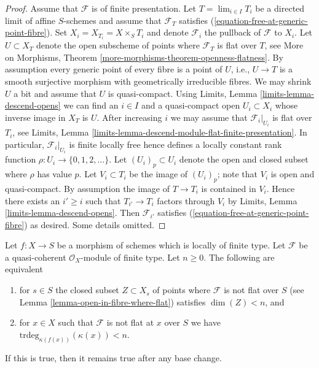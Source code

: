 \begin{proof}
\medskip\noindent
Assume that $\mathcal{F}$ is of finite presentation.
Let $T = \lim_{i \in I} T_i$ be a directed limit of affine $S$-schemes
and assume that $\mathcal{F}_T$ satisfies
(\ref{equation-free-at-generic-point-fibre}).
Set $X_i = X_{T_i} = X \times_S T_i$ and denote $\mathcal{F}_i$ the
pullback of $\mathcal{F}$ to $X_i$.
Let $U \subset X_T$ denote the open subscheme of points where
$\mathcal{F}_T$ is flat over $T$, see
More on Morphisms, Theorem \ref{more-morphisms-theorem-openness-flatness}.
By assumption every generic point of every fibre is a point of $U$, i.e.,
$U \to T$ is a smooth surjective morphism with geometrically irreducible
fibres. We may shrink $U$ a bit and assume that $U$ is quasi-compact.
Using
Limits, Lemma \ref{limits-lemma-descend-opens}
we can find an $i \in I$ and a quasi-compact open $U_i \subset X_i$
whose inverse image in $X_T$ is $U$. After increasing $i$ we may
assume that $\mathcal{F}_i|_{U_i}$ is flat over $T_i$, see
Limits, Lemma \ref{limits-lemma-descend-module-flat-finite-presentation}.
In particular, $\mathcal{F}_i|_{U_i}$ is finite locally free
hence defines a locally constant
rank function $\rho : U_i \to \{0, 1, 2, \ldots \}$.
Let $(U_i)_p \subset U_i$ denote the open and closed
subset where $\rho$ has value $p$. Let $V_i \subset T_i$ be the
image of $(U_i)_p$; note that $V_i$ is open and quasi-compact.
By assumption the image of $T \to T_i$ is contained in $V_i$.
Hence there exists an $i' \geq i$ such that $T_{i'} \to T_i$ factors
through $V_i$ by
Limits, Lemma \ref{limits-lemma-descend-opens}.
Then $\mathcal{F}_{i'}$ satisfies (\ref{equation-free-at-generic-point-fibre})
as desired. Some details omitted.
\end{proof}

\begin{lemma}
\label{lemma-pre-flat-dimension-n}
Let $f : X \to S$ be a morphism of schemes which is locally of finite type.
Let $\mathcal{F}$ be a quasi-coherent $\mathcal{O}_X$-module of finite
type. Let $n \geq 0$. The following are equivalent
\begin{enumerate}
\item for $s \in S$ the closed subset $Z \subset X_s$ of points
where $\mathcal{F}$ is not flat over $S$ (see
Lemma \ref{lemma-open-in-fibre-where-flat})
satisfies $\dim(Z) < n$, and
\item for $x \in X$ such that $\mathcal{F}$ is not flat at $x$
over $S$ we have $\text{trdeg}_{\kappa(f(x))}(\kappa(x)) < n$.
\end{enumerate}
If this is true, then it remains true after any base change.
\end{lemma}

